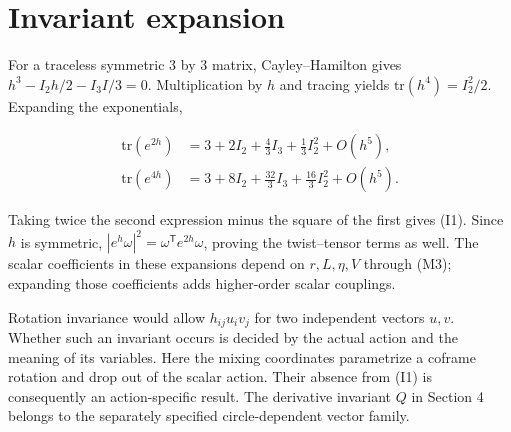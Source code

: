\section{Invariant expansion}

\label{app:G}

For a traceless symmetric 3 by 3 matrix, Cayley--Hamilton gives $h^3-I_2h/2-I_3I/3=0$. Multiplication by $h$ and tracing yields $\mathrm{tr}(h^4)=I_2^2/2$. Expanding the exponentials,

\begin{equation}\tag{G1}\label{eq:G1}
\begin{aligned}
\mathrm{tr}(e^{2h})&=3+2I_2+\frac43I_3+\frac13I_2^2+O(h^5),\\
\mathrm{tr}(e^{4h})&=3+8I_2+\frac{32}{3}I_3+\frac{16}{3}I_2^2+O(h^5).
\end{aligned}
\end{equation}

Taking twice the second expression minus the square of the first gives (I1). Since $h$ is symmetric, $|e^h\omega|^2=\omega^{\mathsf T}e^{2h}\omega$, proving the twist--tensor terms as well. The scalar coefficients in these expansions depend on $r,L,\eta,V$ through (M3); expanding those coefficients adds higher-order scalar couplings.

Rotation invariance would allow $h_{ij}u_iv_j$ for two independent vectors $u,v$. Whether such an invariant occurs is decided by the actual action and the meaning of its variables. Here the mixing coordinates parametrize a coframe rotation and drop out of the scalar action. Their absence from (I1) is consequently an action-specific result. The derivative invariant $Q$ in Section 4 belongs to the separately specified circle-dependent vector family.
